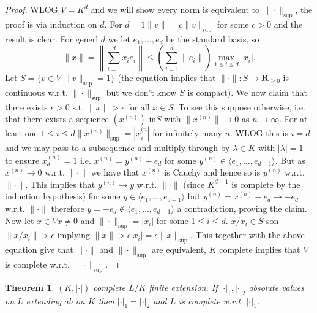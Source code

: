 \documentclass[10pt,]{book}
\newcommand{\gt}{>}
\theoremstyle{plain}
\newtheorem{theorem}{Theorem}[section]
\theoremstyle{definition}
\newcommand{\RR}{\mathbf{R}}
\newcommand{\ab}{|\cdot|}
\begin{document}
\begin{proof}

          WLOG \(V = K^d\) and we will show every norm is equivalent to \(\|\cdot\|_{\sup}\), the proof is via induction on \(d\).
          For \(d = 1\)\(\|v\| = c\|v\|_{\sup}\) for some \(c \gt 0\) and the result is clear.\newline{}
          For generl \(d\) we let \(e_1,\ldots,e_d\) be the standard basis, so
          \[
            \|x\| = \left\| \sum_{i=1}^d x_ie_i\right\| \le \left(\sum_{i=1}^d \|e_i\|\right)\max_{1\le i\le d}|x_i|.
          \]
          Let \(S = \{v\in V | \|v\|_{\sup} = 1\}\) (the equation  implies that \(\|\cdot\| \colon S\to \RR_{\ge 0}\) is continuous w.r.t. \(\|\cdot\|_{\sup}\) but we don't know \(S\) is compact).\newline{}
          We now claim that there exists \(\epsilon \gt 0\) s.t. \(\|x\| \gt \epsilon \) for all \(x\in S\).
          To see this suppose otherwise, i.e. that there exists a sequence \((x^{(n)})\) in\(S\) with \(\|x^(n) \|\to 0\) as \(n \to \infty\).
          For at least one \(1\le i \le d\)\(\|x^{(n)}\|_{\sup} = |x_i^{(n}|\) for infinitely many \(n\).
          WLOG this is \(i=d\) and we may pass to a subsequence and multiply through by \(\lambda\in K\) with \(|\lambda| = 1\) to ensure \(x_d^{(n)} = 1\) i.e. \(x^{(n)} = y^{(n)} + e_d \) for some \(y^{(n)} \in \langle e_1,\ldots,e_{d-1}\rangle\).
          But as \( x^{(n)} \to 0\) w.r.t. \(\|\cdot\|\) we have that \(x^{(n)}\) is Cauchy and hence so is \(y^{(n)}\) w.r.t. \(\|\cdot\|\).
          This implies that \(y^{(n)} \to y\) w.r.t. \(\|\cdot\|\) (since \(K^{d-1}\) is complete by the induction hypothesis) for some \(y \in \langle e_1,\ldots,e_{d-1}\rangle\) but \(y^{(n)} = x^{(n)} -e_d \to -e_d\) w.r.t. \(\|\cdot\|\) therefore \(y = -e_d \not\in \langle e_1,\ldots,e_{d-1}\rangle\) a  contradiction, proving the claim. \newline{}
          Now let \(x\in V\)\(x\ne 0\) and \(\|\cdot\|_{\sup}=|x_i|\) for some \(1\le i\le d\). 
          \(x/x_i\in S\) son \(\|x/x_i\|\gt \epsilon\) implying \(\|x\|\gt \epsilon |x_i | = \epsilon \|x\|_{\sup}\).
          This together with the above equation give that \(\|\cdot\|\) and \(\|\cdot\|_{\sup}\) are equivalent, \(K\) complete implies that \(V\) is complete w.r.t. \(\|\cdot\|_{\sup}\).
        \end{proof}
\begin{theorem}\label{theorem-8}
\((K,\ab)\) complete \(L/K\) finite extension.
          If \(\ab_1,\ab_2\) absolute values on \(L\) extending \(ab\) on \(K\) then \(\ab_1=\ab_2\) and \(L\) is complete w.r.t. \(\ab_1\).
        \end{theorem}
\typeout{************************************************}
\typeout{************************************************}
\end{document}
